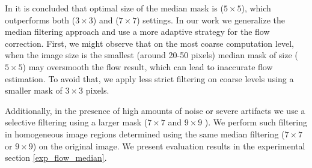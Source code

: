 In \cite{Sun10, Sun14} it is concluded that optimal size of the median mask is ($5 \times 5$), which outperforms both ($3 \times 3$) and ($7 \times 7$) settings.
In our work we generalize the median filtering approach and use a more adaptive strategy for the flow correction. First, we might observe that on the most coarse computation level, when the image size is the smallest (around 20-50 pixels) median mask of size ($5 \times 5$) may oversmooth the flow result, which can lead to inaccurate flow estimation. To avoid that, we apply less strict filtering on coarse levels using a smaller mask of $3 \times 3$ pixels.

Additionally, in the presence of high amounts of noise or severe artifacts we use a selective filtering using a larger mask ($7 \times 7$ and $9 \times 9$ ). We perform such filtering in homogeneous image regions determined using the same median filtering ($7 \times 7$ or $9 \times 9$) on the original image.  
We present evaluation results in the experimental section \ref{exp_flow_median}.





%



